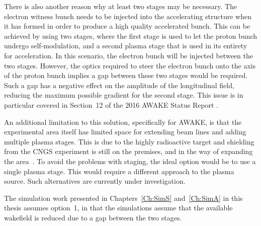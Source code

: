 There is also another reason why at least two stages may be necessary.
The electron witness bunch needs to be injected into the accelerating structure when it has formed in order to produce a high quality accelerated bunch.
This can be achieved by using two stages, where the first stage is used to let the proton bunch undergo self-modulation, and a second plasma stage that is used in its entirety for acceleration.
In this scenario, the electron bunch will be injected between the two stages.
However, the optics required to steer the electron bunch onto the axis of the proton bunch implies a gap between these two stages would be required.
Such a gap has a negative effect on the amplitude of the longitudinal field, reducing the maximum possible gradient for the second stage.
This issue is in particular covered in Section~12 of the 2016 AWAKE Status Report \cite{awake_collaboration:2016}.

An additional limitation to this solution, specifically for AWAKE, is that the experimental area itself has limited space for extending beam lines and adding multiple plasma stages.
This is due to the highly radioactive target and shielding from the CNGS experiment is still on the premises, and in the way of expanding the area~\cite{adli:2016a}.
To avoid the problems with staging, the ideal option would be to use a single plasma stage.
This would require a different approach to the plasma source.
Such alternatives are currently under investigation.

The simulation work presented in Chapters~\ref{Ch:SimS} and~\ref{Ch:SimA} in this thesis assumes option~1, in that the simulations assume that the available wakefield is reduced due to a gap between the two stages.

